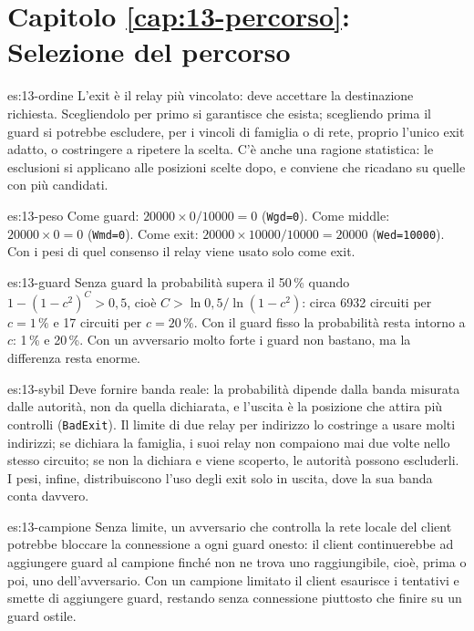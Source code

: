 \section*{Capitolo \ref{cap:13-percorso}: Selezione del percorso}

\begin{soluzione}{es:13-ordine}
L'exit è il relay più vincolato: deve accettare la destinazione richiesta. Scegliendolo per primo si garantisce che esista; scegliendo prima il guard si potrebbe escludere, per i vincoli di famiglia o di rete, proprio l'unico exit adatto, o costringere a ripetere la scelta. C'è anche una ragione statistica: le esclusioni si applicano alle posizioni scelte dopo, e conviene che ricadano su quelle con più candidati.
\end{soluzione}

\begin{soluzione}{es:13-peso}
Come guard: $20000 \times 0/10000 = 0$ (\texttt{Wgd=0}). Come middle: $20000 \times 0 = 0$ (\texttt{Wmd=0}). Come exit: $20000 \times 10000/10000 = 20000$ (\texttt{Wed=10000}). Con i pesi di quel consenso il relay viene usato solo come exit.
\end{soluzione}

\begin{soluzione}{es:13-guard}
Senza guard la probabilità supera il 50\,\% quando $1 - (1 - c^2)^C > 0{,}5$, cioè $C > \ln 0{,}5 / \ln(1 - c^2)$: circa \num{6932} circuiti per $c = 1\,\%$ e 17 circuiti per $c = 20\,\%$. Con il guard fisso la probabilità resta intorno a $c$: 1\,\% e 20\,\%. Con un avversario molto forte i guard non bastano, ma la differenza resta enorme.
\end{soluzione}

\begin{soluzione}{es:13-sybil}
Deve fornire banda reale: la probabilità dipende dalla banda misurata dalle autorità, non da quella dichiarata, e l'uscita è la posizione che attira più controlli (\texttt{BadExit}). Il limite di due relay per indirizzo lo costringe a usare molti indirizzi; se dichiara la famiglia, i suoi relay non compaiono mai due volte nello stesso circuito; se non la dichiara e viene scoperto, le autorità possono escluderli. I pesi, infine, distribuiscono l'uso degli exit solo in uscita, dove la sua banda conta davvero.
\end{soluzione}

\begin{soluzione}{es:13-campione}
Senza limite, un avversario che controlla la rete locale del client potrebbe bloccare la connessione a ogni guard onesto: il client continuerebbe ad aggiungere guard al campione finché non ne trova uno raggiungibile, cioè, prima o poi, uno dell'avversario. Con un campione limitato il client esaurisce i tentativi e smette di aggiungere guard, restando senza connessione piuttosto che finire su un guard ostile.
\end{soluzione}

